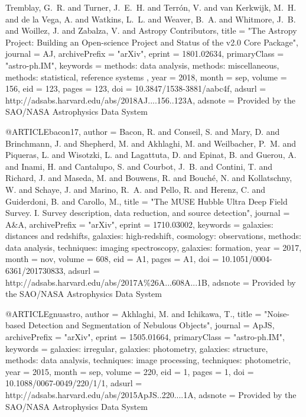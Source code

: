 {{	{Tremblay}, G.~R. and {Turner}, J.~E.~H. and {Terr{\'o}n}, V. and
	{van Kerkwijk}, M.~H. and {de la Vega}, A. and {Watkins}, L.~L. and
	{Weaver}, B.~A. and {Whitmore}, J.~B. and {Woillez}, J. and
	{Zabalza}, V. and {Astropy Contributors}},
    title = "{The Astropy Project: Building an Open-science Project and Status of the v2.0 Core Package}",
  journal = {AJ},
archivePrefix = "arXiv",
   eprint = {1801.02634},
 primaryClass = "astro-ph.IM",
 keywords = {methods: data analysis, methods: miscellaneous, methods: statistical, reference systems },
     year = 2018,
    month = sep,
   volume = 156,
      eid = {123},
    pages = {123},
      doi = {10.3847/1538-3881/aabc4f},
   adsurl = {http://adsabs.harvard.edu/abs/2018AJ....156..123A},
  adsnote = {Provided by the SAO/NASA Astrophysics Data System}
}





@ARTICLE{bacon17,
   author = {{Bacon}, R. and {Conseil}, S. and {Mary}, D. and {Brinchmann}, J. and
	{Shepherd}, M. and {Akhlaghi}, M. and {Weilbacher}, P.~M. and
	{Piqueras}, L. and {Wisotzki}, L. and {Lagattuta}, D. and {Epinat}, B. and
	{Guerou}, A. and {Inami}, H. and {Cantalupo}, S. and {Courbot}, J.~B. and
	{Contini}, T. and {Richard}, J. and {Maseda}, M. and {Bouwens}, R. and
	{Bouch{\'e}}, N. and {Kollatschny}, W. and {Schaye}, J. and
	{Marino}, R.~A. and {Pello}, R. and {Herenz}, C. and {Guiderdoni}, B. and
	{Carollo}, M.},
    title = "{The MUSE Hubble Ultra Deep Field Survey. I. Survey description, data reduction, and source detection}",
  journal = {A\&A},
archivePrefix = "arXiv",
   eprint = {1710.03002},
 keywords = {galaxies: distances and redshifts, galaxies: high-redshift, cosmology: observations, methods: data analysis, techniques: imaging spectroscopy, galaxies: formation},
     year = 2017,
    month = nov,
   volume = 608,
      eid = {A1},
    pages = {A1},
      doi = {10.1051/0004-6361/201730833},
   adsurl = {http://adsabs.harvard.edu/abs/2017A\%26A...608A...1B},
  adsnote = {Provided by the SAO/NASA Astrophysics Data System}
}





@ARTICLE{gnuastro,
   author = {{Akhlaghi}, M. and {Ichikawa}, T.},
    title = "{Noise-based Detection and Segmentation of Nebulous Objects}",
  journal = {ApJS},
archivePrefix = "arXiv",
   eprint = {1505.01664},
 primaryClass = "astro-ph.IM",
 keywords = {galaxies: irregular, galaxies: photometry, galaxies: structure, methods: data analysis, techniques: image processing, techniques: photometric},
     year = 2015,
    month = sep,
   volume = 220,
      eid = {1},
    pages = {1},
      doi = {10.1088/0067-0049/220/1/1},
   adsurl = {http://adsabs.harvard.edu/abs/2015ApJS..220....1A},
  adsnote = {Provided by the SAO/NASA Astrophysics Data System}
}




